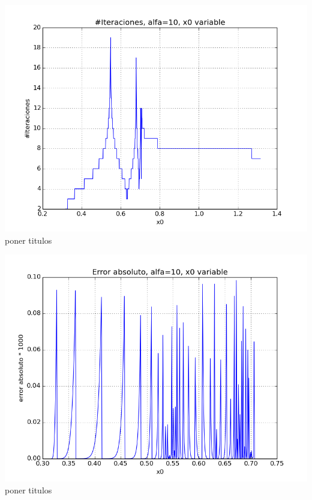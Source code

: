 \begin{center}
\includegraphics[scale=0.5]{graficos/iteraciones-e-newton-alfa_fijo-absoluto-0.0001-alejando.png}\\
poner titulos
\end{center}

\begin{center}
\includegraphics[scale=0.5]{graficos/x0s-e-newton-alfa_fijo-absoluto-0.0001-alejando.png}\\
poner titulos
\end{center}

